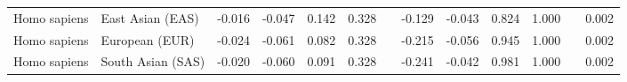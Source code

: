 \begin{center}
\begin{adjustbox}{width = 1\textwidth}
\begin{tabular}{|l|l|r|r|r|r|r|r|r|r|r|}
        Homo sapiens &                East Asian (EAS) &                -0.016 &                               -0.047 &                0.142 &                                  0.328~~ &                -0.129 &                               -0.043 &                0.824 &                                  1.000~~ &              0.002 \\
        Homo sapiens &                  European (EUR) &                -0.024 &                               -0.061 &                0.082 &                                  0.328~~ &                -0.215 &                               -0.056 &                0.945 &                                  1.000~~ &              0.002 \\
        Homo sapiens &               South Asian (SAS) &                -0.020 &                               -0.060 &                0.091 &                                  0.328~~ &                -0.241 &                               -0.042 &                0.981 &                                  1.000~~ &              0.002 \\
\bottomrule
\end{tabular}
\end{adjustbox}
\end{center}
\newpage
